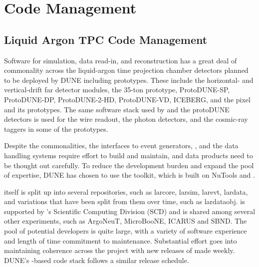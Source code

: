 \documentclass[../main-v1.tex]{subfiles}
\begin{document}
\chapter{Code Management }
\label{ch:codemgmt}


\section{Liquid Argon TPC Code Management }
\label{sec:codemgmt:dunetpc}  %

Software for simulation, data read-in, and reconstruction %
has a great deal of commonality across the %
liquid-argon time projection chamber detectors 
 planned to be deployed by DUNE including prototypes.  These  
  include the %
  horizontal- and vertical-drift far detector modules, the 35-ton prototype, ProtoDUNE-SP, ProtoDUNE-DP, ProtoDUNE-2-HD, ProtoDUNE-VD, ICEBERG, and the pixel  and its prototypes.
The same software stack used by  and the protoDUNE detectors is used for the wire readout, the photon detectors, and the cosmic-ray taggers  in some of the prototypes.  

Despite the commonalities, the interfaces to event generators, ,  and the data handling systems require effort to build and maintain, and data products need to be thought out carefully.  To reduce the development burden and expand the pool of expertise, DUNE has chosen to use the  toolkit, which is built on NuTools and .  

 itself is split up into several repositories, such as larcore, larsim, larevt, lardata, and variations that have been split from them over time, such as lardataobj.   is supported by 's Scientific Computing Division (SCD) and is shared among several other experiments, such as ArgoNeuT, MicroBooNE, ICARUS and SBND. The pool of potential developers is quite large,  with a variety
 of software experience and length of time commitment to maintenance.
Substantial effort goes into maintaining coherence across the project with new releases of    made weekly.  DUNE's -based code stack follows a similar release schedule.
\end{document}
